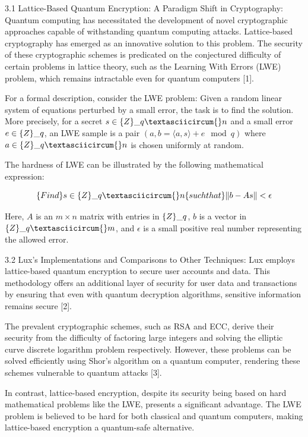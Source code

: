 \documentclass[11pt]{article}
\begin{document}
3.1 Lattice-Based Quantum Encryption: A Paradigm Shift in Cryptography: Quantum computing has necessitated the development of novel cryptographic approaches capable of withstanding quantum computing attacks. Lattice-based cryptography has emerged as an innovative solution to this problem. The security of these cryptographic schemes is predicated on the conjectured difficulty of certain problems in lattice theory, such as the Learning With Errors (LWE) problem, which remains intractable even for quantum computers [1].


For a formal description, consider the LWE problem: Given a random linear system of equations perturbed by a small error, the task is to find the solution. More precisely, for a secret \(s \in \mathbb\{Z\}\_q\textasciicircum{}n\) and a small error \(e \in \mathbb\{Z\}\_q\), an LWE sample is a pair \((a, b = \langle a, s \rangle + e \mod q)\) where \(a \in \mathbb\{Z\}\_q\textasciicircum{}n\) is chosen uniformly at random.


The hardness of LWE can be illustrated by the following mathematical expression:


\[\text\{Find \} s \in \mathbb\{Z\}\_q\textasciicircum{}n \text\{ such that \} \|b - As\| < \epsilon\]


Here, \(A\) is an \(m \times n\) matrix with entries in \(\mathbb\{Z\}\_q\), \(b\) is a vector in \(\mathbb\{Z\}\_q\textasciicircum{}m\), and \(\epsilon\) is a small positive real number representing the allowed error.


3.2 Lux's Implementations and Comparisons to Other Techniques: Lux employs lattice-based quantum encryption to secure user accounts and data. This methodology offers an additional layer of security for user data and transactions by ensuring that even with quantum decryption algorithms, sensitive information remains secure [2].


The prevalent cryptographic schemes, such as RSA and ECC, derive their security from the difficulty of factoring large integers and solving the elliptic curve discrete logarithm problem respectively. However, these problems can be solved efficiently using Shor's algorithm on a quantum computer, rendering these schemes vulnerable to quantum attacks [3].


In contrast, lattice-based encryption, despite its security being based on hard mathematical problems like the LWE, presents a significant advantage. The LWE problem is believed to be hard for both classical and quantum computers, making lattice-based encryption a quantum-safe alternative.
\end{document}
